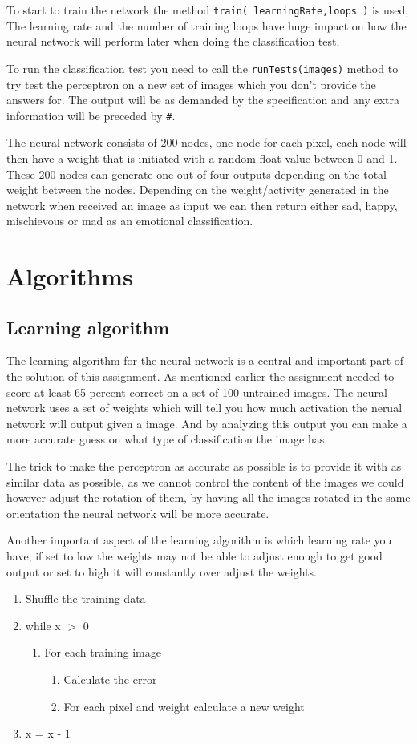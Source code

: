 \documentclass[a4paper, 12pt]{article}
\begin{document}
To start to train the network the method \verb|train( learningRate,loops )| is used, The learning rate and the number of training loops have huge impact on how the neural network will perform later when doing the classification test.

To run the classification test you need to call the \verb|runTests(images)| method to try test the perceptron on a new set of images which you don't provide the answers for. The output will be as demanded by the specification and any extra information will be preceded by \verb|#|.

The neural network consists of 200 nodes, one node for each pixel, each node will then have a weight that is initiated with a random float value between 0 and 1. These 200 nodes can generate one out of four outputs depending on the total weight between the nodes. Depending on the weight/activity generated in the network when received an image as input we can then return either sad, happy, mischievous or mad as an emotional classification.

\clearpage\section{Algorithms}
\subsection{Learning algorithm}
The learning algorithm for the neural network is a central and important part of the solution of this assignment. As mentioned earlier the assignment needed to score at least 65 percent correct on a set of 100 untrained images. The neural network uses a set of weights which will tell you how much activation the nerual network will output given a image. And by analyzing this output you can make a more accurate guess on what type of classification the image has.

The trick to make the perceptron as accurate as possible is to provide it with as similar data as possible, as we cannot control the content of the images we could however adjust the rotation of them, by having all the images rotated in the same orientation the neural network will be more accurate.

Another important aspect of the learning algorithm is which learning rate you have, if set to low the weights may not be able to adjust enough to get good output or set to high it will constantly over adjust the weights.
\begin{enumerate}
\item Shuffle the training data
\item while x $>$ 0
	\begin{enumerate}
	\item For each training image
      \begin{enumerate}
	  \item Calculate the error
      \item For each pixel and weight calculate a new weight
      \end{enumerate}
	\end{enumerate}
\item x = x - 1
\end{enumerate}
\end{document}

